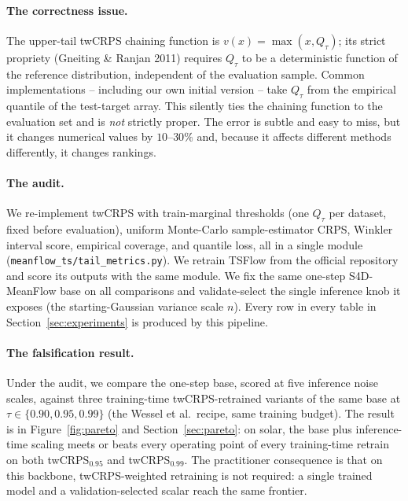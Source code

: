 \documentclass{article}
\begin{document}
\paragraph{The correctness issue.} The upper-tail twCRPS chaining
function is $v(x) = \max(x, Q_\tau)$; its strict propriety (Gneiting
\& Ranjan 2011) requires $Q_\tau$ to be a deterministic function of
the reference distribution, independent of the evaluation sample.
Common implementations -- including our own initial version -- take
$Q_\tau$ from the empirical quantile of the test-target array. This
silently ties the chaining function to the evaluation set and is
\emph{not} strictly proper. The error is subtle and easy to miss,
but it changes numerical values by $10$--$30\%$ and, because it
affects different methods differently, it changes rankings.

\paragraph{The audit.} We re-implement twCRPS with train-marginal
thresholds (one $Q_\tau$ per dataset, fixed before evaluation),
uniform Monte-Carlo sample-estimator CRPS, Winkler interval score,
empirical coverage, and quantile loss, all in a single module
(\texttt{meanflow\_ts/tail\_metrics.py}). We retrain TSFlow from the
official repository and score its outputs with the same module.
We fix the same one-step S4D-MeanFlow base on all comparisons and
validate-select the single inference knob it exposes (the
starting-Gaussian variance scale $n$). Every row in every table in
Section~\ref{sec:experiments} is produced by this pipeline.

\paragraph{The falsification result.} Under the audit, we compare
the one-step base, scored at five inference noise scales, against
three training-time twCRPS-retrained variants of the same base at
$\tau \in \{0.90, 0.95, 0.99\}$ (the Wessel et al.\ recipe, same
training budget). The result is in Figure~\ref{fig:pareto} and
Section~\ref{sec:pareto}: on solar, the base plus inference-time
scaling meets or beats every operating point of every training-time
retrain on both twCRPS$_{0.95}$ and twCRPS$_{0.99}$. The
practitioner consequence is that on this backbone, twCRPS-weighted
retraining is not required: a single trained model and a
validation-selected scalar reach the same frontier.
\end{document}

